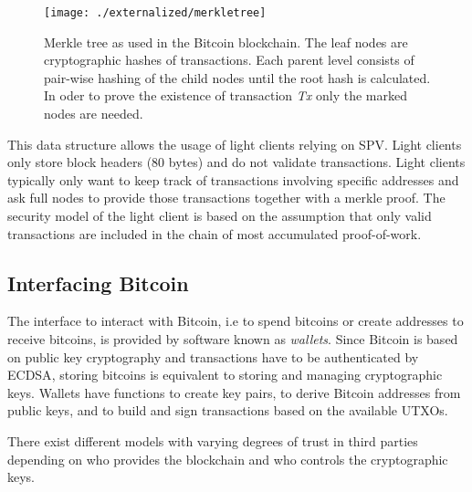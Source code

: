 \begin{figure}[!t]
    \centering
    \texttt{[image: ./externalized/merkletree]}
    \caption{Merkle tree as used in the Bitcoin blockchain. The leaf nodes are cryptographic hashes of transactions. Each parent level consists of pair-wise hashing of the child nodes until the root hash is calculated. In oder to prove the existence of transaction \emph{Tx} only the marked nodes are needed.}
    \label{fig:merkletree}
  \end{figure} 

  This data structure allows the usage of light clients relying on \ac{SPV}. Light clients only store block headers (80 bytes) and do not validate transactions. Light clients typically only want to keep track of transactions involving specific addresses and ask full nodes to provide those transactions together with a merkle proof. The security model of the light client is based on the assumption that only valid transactions are included in the chain of most accumulated proof-of-work. 


\subsection{Interfacing Bitcoin}

The interface to interact with Bitcoin, i.e to spend bitcoins or create addresses to receive bitcoins, is provided by software known as \emph{wallets}. Since Bitcoin is based on public key cryptography and transactions have to be authenticated by \ac{ECDSA}, storing bitcoins is equivalent to storing and managing cryptographic keys. Wallets have functions to create key pairs, to derive Bitcoin addresses from public keys, and to build and sign transactions based on the available \ac{UTXO}s. 

There exist different models with varying degrees of trust in third parties depending on who provides the blockchain and who controls the cryptographic keys. 



